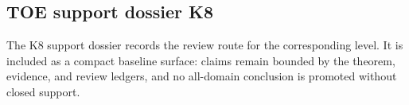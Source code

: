 \subsection{TOE support dossier K8}
The K8 support dossier records the review route for the corresponding level. It is included as a compact baseline surface: claims remain bounded by the theorem, evidence, and review ledgers, and no all-domain conclusion is promoted without closed support.
